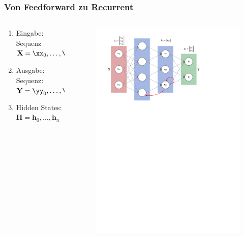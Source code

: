 \documentclass[german,aspectratio=169]{beamer}
\begin{document}
\begin{frame}
	\frametitle{Von Feedforward zu Recurrent}
	\begin{columns}
		\begin{column}{0.3\textwidth}
			\begin{enumerate}[label=$\bullet$]
				\item Eingabe: Sequenz $\mathbf{X} = \xx_0, \ldots, \xx_n$
				\item Ausgabe: Sequenz: $\mathbf{Y} = \yy_0, \ldots, \yy_n$
				\item Hidden States: $\mathbf{H} = \mathbf{h}_0, \ldots, \mathbf{h}_n$
			\end{enumerate}
		\end{column}
		\begin{column}{0.7\textwidth}
			\begin{figure}
				\includegraphics[width=\textwidth]{rnn-labeled}
			\end{figure}
		\end{column}
	\end{columns}
\end{frame}
\end{document}
